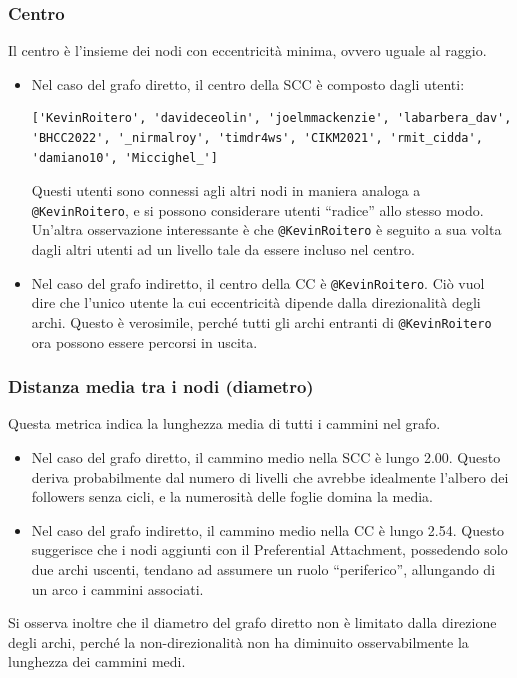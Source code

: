 \documentclass[a4paper, 11pt, twoside]{article}
\begin{document}
\subsubsection{Centro}
Il centro è l'insieme dei nodi con eccentricità minima, ovvero uguale al raggio.
\begin{itemize}
    \item Nel caso del grafo diretto, il centro della SCC è composto dagli utenti:
          \begin{lstlisting}
['KevinRoitero', 'davideceolin', 'joelmmackenzie', 'labarbera_dav', 'BHCC2022', '_nirmalroy', 'timdr4ws', 'CIKM2021', 'rmit_cidda', 'damiano10', 'Miccighel_']\end{lstlisting}
          Questi utenti sono connessi agli altri nodi in maniera analoga a \texttt{@KevinRoitero}, e si possono considerare utenti ``radice'' allo stesso modo.
          Un'altra osservazione interessante è che \texttt{@KevinRoitero} è seguito a sua volta dagli altri utenti ad un livello tale da essere incluso nel centro.
    \item Nel caso del grafo indiretto, il centro della CC è \texttt{@KevinRoitero}. Ciò vuol dire che l'unico utente la cui eccentricità dipende dalla direzionalità degli archi. Questo è verosimile, perché tutti gli archi entranti di \texttt{@KevinRoitero} ora possono essere percorsi in uscita.
\end{itemize}

\subsubsection{Distanza media tra i nodi (diametro)}
Questa metrica indica la lunghezza media di tutti i cammini nel grafo.
\begin{itemize}
    \item Nel caso del grafo diretto, il cammino medio nella SCC è lungo 2.00. Questo deriva probabilmente dal numero di livelli che avrebbe idealmente l'albero dei followers senza cicli, e la numerosità delle foglie domina la media.
    \item Nel caso del grafo indiretto, il cammino medio nella CC è lungo 2.54. Questo suggerisce che i nodi aggiunti con il Preferential Attachment, possedendo solo due archi uscenti, tendano ad assumere un ruolo ``periferico'', allungando di un arco i cammini associati.
\end{itemize}

Si osserva inoltre che il diametro del grafo diretto non è limitato dalla direzione degli archi, perché
la non-direzionalità non ha diminuito osservabilmente la lunghezza dei cammini medi.
\end{document}
